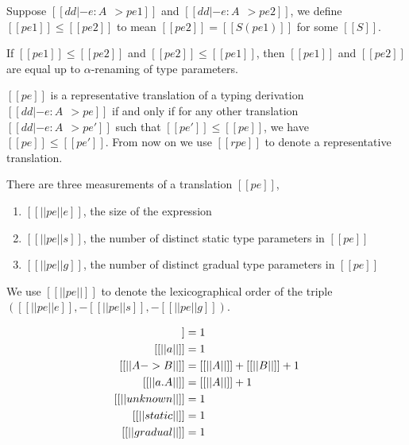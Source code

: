 \begin{definition}
  Suppose $[[dd |- e : A ~~> pe1]]$ and $[[dd |- e : A ~~> pe2]]$,
  we define $[[pe1]] \leq [[pe2]]$ to mean $[[pe2]] = [[S(pe1)]]$ for
  some $[[S]]$.
\end{definition}


\begin{proposition}
  If $[[ pe1 ]] \leq [[pe2]]$ and $[[ pe2 ]] \leq [[pe1]]$, then $[[pe1]]$ and $[[pe2]]$
  are equal up to $\alpha$-renaming of type parameters.
\end{proposition}

 
\begin{definition}
  $[[pe]]$ is a representative translation of a typing derivation $[[dd |- e : A
  ~~> pe]]$ if and only if for any other translation $[[dd |- e : A ~~> pe']]$ such that $[[pe']]
  \leq [[pe]]$, we have $[[pe]] \leq [[pe']]$. From now on we use $[[rpe]]$ to
  denote a representative translation.
\end{definition}

\begin{definition}
  There are three measurements of a translation $[[pe]]$,
  \begin{enumerate}
  \item $[[ ||pe||e]]$, the size of the expression 
  \item $[[ ||pe||s ]]$, the number of distinct static type parameters in $[[pe]]$
  \item $[[ ||pe||g ]]$, the number of distinct gradual type parameters in $[[pe]]$
  \end{enumerate}
  We use $[[ ||pe|| ]]$ to denote the lexicographical order of the triple
  $([[ ||pe||e ]], -[[ ||pe||s ]], -[[ ||pe||g ]])$.
\end{definition}

\begin{definition}

  \begin{align*}
    [[ || int ||  ]] &= 1 \\
    [[ || a ||  ]] &= 1 \\
    [[ || A -> B  ||  ]] &= [[ || A || ]] + [[ || B || ]] + 1 \\
    [[ || \/a . A ||  ]] &= [[ || A || ]] + 1 \\
    [[ || unknown ||  ]] &= 1 \\
    [[ || static ||  ]] &= 1 \\
    [[ || gradual ||  ]] &= 1
  \end{align*}

\end{definition}


